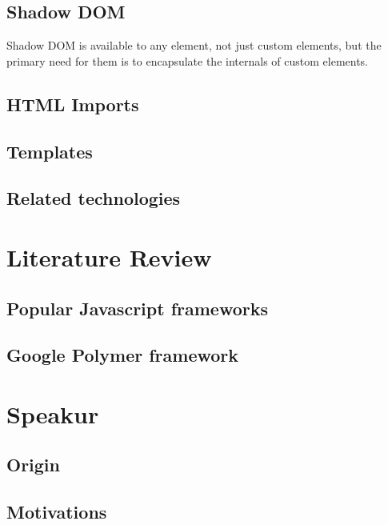 \subsection{Shadow DOM}
Shadow DOM is available to any element, not just custom elements, but the primary need for them is to encapsulate the internals of custom elements.
\subsection{HTML Imports}
\subsection{Templates}
\subsection{Related technologies}

\section{Literature Review}
\subsection{Popular Javascript frameworks}
\subsection{Google Polymer framework}

\section{Speakur}
\subsection{Origin}
\subsection{Motivations}

